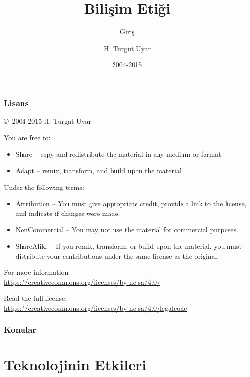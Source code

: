 \documentclass[dvipsnames]{beamer}
\title{Bilişim Etiği}
\subtitle{Giriş}
\author{H. Turgut Uyar}
\date{2004-2015}
\theoremstyle{plain}
\begin{document}
\begin{frame}
  \titlepage
\end{frame}

\begin{frame}
  \frametitle{Lisans}

  \hfill
  \copyright~2004-2015 H. Turgut Uyar

  \vfill
  \begin{footnotesize}
    You are free to:
    \begin{itemize}
      \itemsep0em
      \item Share -- copy and redistribute the material in any medium or format
      \item Adapt -- remix, transform, and build upon the material
    \end{itemize}

    Under the following terms:
    \begin{itemize}
      \itemsep0em
      \item Attribution -- You must give appropriate credit, provide a link to
        the license, and indicate if changes were made.

      \item NonCommercial -- You may not use the material for commercial
        purposes.

      \item ShareAlike -- If you remix, transform, or build upon the material,
        you must distribute your contributions under the same license as the
        original.
    \end{itemize}
  \end{footnotesize}

  \begin{small}
    For more information:\\
    \url{https://creativecommons.org/licenses/by-nc-sa/4.0/}

    \smallskip
    Read the full license:\\
    \url{https://creativecommons.org/licenses/by-nc-sa/4.0/legalcode}
  \end{small}
\end{frame}

\begin{frame}
  \frametitle{Konular}
  \tableofcontents
\end{frame}

\section{Teknolojinin Etkileri}
\end{document}
